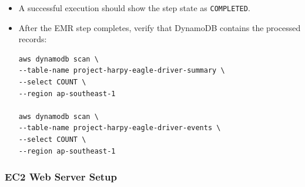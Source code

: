 \documentclass[12pt,a4paper]{article}
\begin{document}
\begin{itemize}
    \item A successful execution should show the step state as \texttt{COMPLETED}.
    \item After the EMR step completes, verify that DynamoDB contains the processed records:
\begin{lstlisting}
aws dynamodb scan \
--table-name project-harpy-eagle-driver-summary \
--select COUNT \
--region ap-southeast-1

aws dynamodb scan \
--table-name project-harpy-eagle-driver-events \
--select COUNT \
--region ap-southeast-1
\end{lstlisting}
\end{itemize}

\subsubsection{EC2 Web Server Setup}
\end{document}
